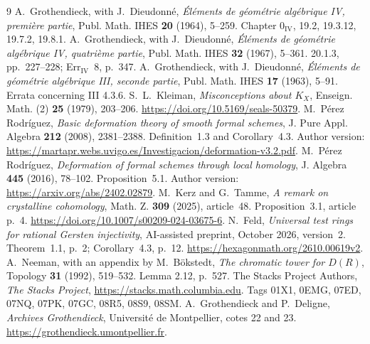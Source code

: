 \documentclass[11pt]{article}
\theoremstyle{definition}\newtheorem{definition}[theorem]{Definition}
\theoremstyle{remark}\newtheorem{remark}[theorem]{Remark}
\begin{document}
\begin{thebibliography}{9}
 A.~Grothendieck, with J.~Dieudonn\'e, \emph{\'El\'ements de g\'eom\'etrie alg\'ebrique IV, premi\`ere partie}, Publ. Math. IHES \textbf{20} (1964), 5--259. Chapter $0_{\mathrm{IV}}$, 19.2, 19.3.12, 19.7.2, 19.8.1.
 A.~Grothendieck, with J.~Dieudonn\'e, \emph{\'El\'ements de g\'eom\'etrie alg\'ebrique IV, quatri\`eme partie}, Publ. Math. IHES \textbf{32} (1967), 5--361. 20.1.3, pp.~227--228; Err$_{\mathrm{IV}}$~8, p.~347.
 A.~Grothendieck, with J.~Dieudonn\'e, \emph{\'El\'ements de g\'eom\'etrie alg\'ebrique III, seconde partie}, Publ. Math. IHES \textbf{17} (1963), 5--91. Errata concerning III 4.3.6.
 S.~L.~Kleiman, \emph{Misconceptions about $K_X$}, Enseign. Math. (2) \textbf{25} (1979), 203--206. \url{https://doi.org/10.5169/seals-50379}.
 M.~P\'erez Rodr\'iguez, \emph{Basic deformation theory of smooth formal schemes}, J. Pure Appl. Algebra \textbf{212} (2008), 2381--2388. Definition~1.3 and Corollary~4.3. Author version: \url{https://martapr.webs.uvigo.es/Investigacion/deformation-v3.2.pdf}.
 M.~P\'erez Rodr\'iguez, \emph{Deformation of formal schemes through local homology}, J. Algebra \textbf{445} (2016), 78--102. Proposition~5.1. Author version: \url{https://arxiv.org/abs/2402.02879}.
 M.~Kerz and G.~Tamme, \emph{A remark on crystalline cohomology}, Math. Z. \textbf{309} (2025), article~48. Proposition~3.1, article p.~4. \url{https://doi.org/10.1007/s00209-024-03675-6}.
 N.~Feld, \emph{Universal test rings for rational Gersten injectivity}, AI-assisted preprint, October 2026, version~2. Theorem~1.1, p.~2; Corollary~4.3, p.~12. \url{https://hexagonmath.org/2610.00619v2}.
 A.~Neeman, with an appendix by M.~B\"okstedt, \emph{The chromatic tower for $D(R)$}, Topology \textbf{31} (1992), 519--532. Lemma 2.12, p.~527.
 The Stacks Project Authors, \emph{The Stacks Project}, \url{https://stacks.math.columbia.edu}. Tags 01X1, 0EMG, 07ED, 07NQ, 07PK, 07GC, 08R5, 08S9, 08SM.
 A.~Grothendieck and P.~Deligne, \emph{Archives Grothendieck}, Universit\'e de Montpellier, cotes 22 and 23. \url{https://grothendieck.umontpellier.fr}.
\end{thebibliography}
\end{document}
